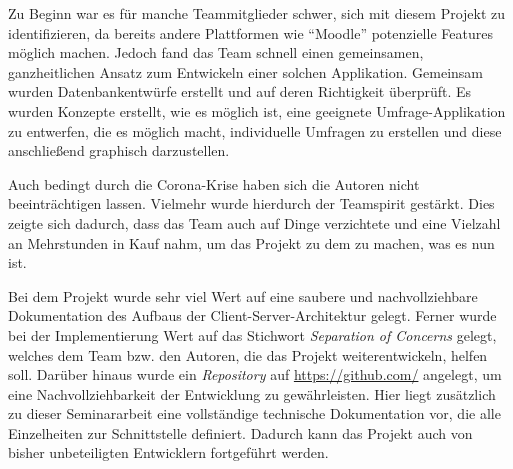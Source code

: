 Zu Beginn war es für manche Teammitglieder schwer, sich mit diesem Projekt zu identifizieren, da bereits andere Plattformen wie \enquote{Moodle} potenzielle Features möglich machen.
Jedoch fand das Team schnell einen gemeinsamen, ganzheitlichen Ansatz zum Entwickeln einer solchen Applikation.
Gemeinsam wurden Datenbankentwürfe erstellt und auf deren Richtigkeit überprüft.
Es wurden Konzepte erstellt, wie es möglich ist, eine geeignete Umfrage-Applikation zu entwerfen, die es möglich macht, individuelle Umfragen zu erstellen und diese anschließend graphisch darzustellen.

Auch bedingt durch die Corona-Krise haben sich die Autoren nicht beeinträchtigen lassen.
Vielmehr wurde hierdurch der Teamspirit gestärkt.
Dies zeigte sich \ua dadurch, dass das Team auch auf Dinge verzichtete und eine Vielzahl an Mehrstunden in Kauf nahm, um das Projekt zu dem zu machen, was es nun ist.

Bei dem Projekt wurde sehr viel Wert auf eine saubere und nachvollziehbare Dokumentation des Aufbaus der Client-Server-Architektur gelegt.
Ferner wurde bei der Implementierung Wert auf das Stichwort \emph{Separation of Concerns} gelegt, welches dem Team bzw. den Autoren, die das Projekt weiterentwickeln, helfen soll.
Darüber hinaus wurde ein \emph{Repository} auf \url{https://github.com/} angelegt, um eine Nachvollziehbarkeit der Entwicklung zu gewährleisten.
Hier liegt zusätzlich zu dieser Seminararbeit eine vollständige technische Dokumentation vor, die alle Einzelheiten zur Schnittstelle definiert.
Dadurch kann das Projekt auch von bisher unbeteiligten Entwicklern fortgeführt werden.
